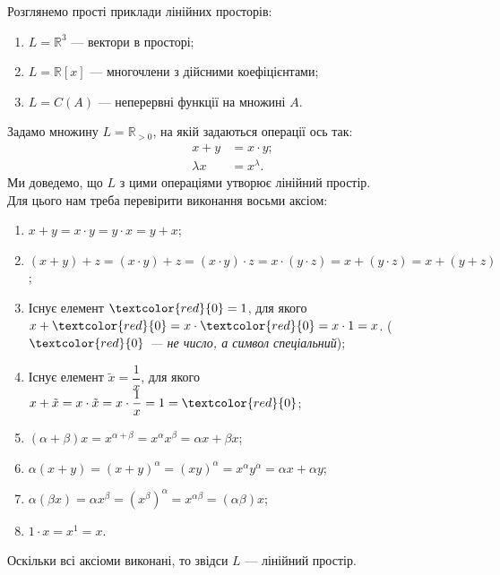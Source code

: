 \documentclass{math_library}
\begin{document}
	\begin{example}
	Розглянемо прості приклади лінійних просторів:
	\begin{enumerate}[nosep, wide=0pt, label={\arabic*)}]
	\item $L = \mathbb{R}^3$ --- вектори в просторі;
	\item $L = \mathbb{R}[x]$ --- многочлени з дійсними коефіцієнтами;
	\item $L = C(A)$ --- неперервні функції на множині $A$.
	\end{enumerate}
	\end{example}
	
	\begin{example}
	Задамо множину $L = \mathbb{R}_{> 0}$, на якій задаються операції ось так:
	\begin{align*}
	x + y & = x \cdot y; \\
	\lambda x & = x^\lambda.
	\end{align*}
	Ми доведемо, що $L$ з цими операціями утворює лінійний простір.
	\bigskip \\
	Для цього нам треба перевірити виконання восьми аксіом:
	\begin{enumerate}[nosep, wide=0pt, label={\arabic*)}]
	\item $x+y = x \cdot y = y \cdot x = y + x$;
	\item $(x+y) + z = (x \cdot y) + z = (x \cdot y) \cdot z = x \cdot (y \cdot z) = x + (y \cdot z) = x + (y + z)$;
	\item Існує елемент $\textcolor{red}{0} = 1$, для якого $x + \textcolor{red}{0} = x \cdot \textcolor{red}{0} = x \cdot 1 = x$. (\textit{$\textcolor{red}{0}$ --- не число, а символ спеціальний});
	\item Існує елемент $\tilde{x} = \dfrac{1}{x}$, для якого $x + \tilde{x} = x \cdot \tilde{x} = x \cdot \dfrac{1}{x} = 1 = \textcolor{red}{0}$;
	\item $(\alpha + \beta)x = x^{\alpha + \beta} = x^{\alpha} x^{\beta} = \alpha x + \beta x$;
	\item $\alpha (x+y) = (x+y)^\alpha = (xy)^{\alpha} = x^{\alpha} y^{\alpha} = \alpha x + \alpha y$;
	\item $\alpha (\beta x) = \alpha x^\beta = (x^\beta)^\alpha = x^{\alpha \beta} = (\alpha \beta) x$;
	\item $1 \cdot x = x^1 = x$.
	\end{enumerate}
	Оскільки всі аксіоми виконані, то звідси $L$ --- лінійний простір.
	\end{example}
	
\end{document}
